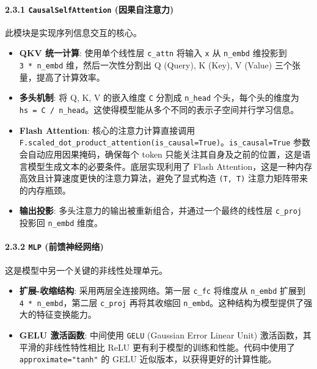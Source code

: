 \documentclass[a4paper]{article}
\providecommand{\tightlist}{%
  \setlength{\itemsep}{0pt}\setlength{\parskip}{0pt}}
\begin{document}
\paragraph{\texorpdfstring{2.3.1 \texttt{CausalSelfAttention}
(因果自注意力)}{2.3.1 CausalSelfAttention (因果自注意力)}}\label{causalselfattention-ux56e0ux679cux81eaux6ce8ux610fux529b}

此模块是实现序列信息交互的核心。

\begin{itemize}
\tightlist
\item
  \textbf{QKV 统一计算}: 使用单个线性层 \texttt{c\_attn} 将输入
  \texttt{x} 从 \texttt{n\_embd} 维投影到 \texttt{3\ *\ n\_embd}
  维，然后一次性分割出 Q (Query), K (Key), V (Value)
  三个张量，提高了计算效率。
\item
  \textbf{多头机制}: 将 Q, K, V 的嵌入维度 \texttt{C} 分割成
  \texttt{n\_head} 个头，每个头的维度为
  \texttt{hs\ =\ C\ /\ n\_head}。这使得模型能从多个不同的表示子空间并行学习信息。
\item
  \textbf{Flash Attention}: 核心的注意力计算直接调用
  \texttt{F.scaled\_dot\_product\_attention(is\_causal=True)}。\texttt{is\_causal=True}
  参数会自动应用因果掩码，确保每个 token
  只能关注其自身及之前的位置，这是语言模型生成文本的必要条件。底层实现利用了
  Flash
  Attention，这是一种内存高效且计算速度更快的注意力算法，避免了显式构造
  \texttt{(T,\ T)} 注意力矩阵带来的内存瓶颈。
\item
  \textbf{输出投影}: 多头注意力的输出被重新组合，并通过一个最终的线性层
  \texttt{c\_proj} 投影回 \texttt{n\_embd} 维度。
\end{itemize}

\paragraph{\texorpdfstring{2.3.2 \texttt{MLP}
(前馈神经网络)}{2.3.2 MLP (前馈神经网络)}}\label{mlp-ux524dux9988ux795eux7ecfux7f51ux7edc}

这是模型中另一个关键的非线性处理单元。

\begin{itemize}
\tightlist
\item
  \textbf{扩展-收缩结构}: 采用两层全连接网络。第一层 \texttt{c\_fc}
  将维度从 \texttt{n\_embd} 扩展到 \texttt{4\ *\ n\_embd}，第二层
  \texttt{c\_proj} 再将其收缩回
  \texttt{n\_embd}。这种结构为模型提供了强大的特征变换能力。
\item
  \textbf{GELU 激活函数}: 中间使用 \texttt{GELU} (Gaussian Error Linear
  Unit) 激活函数，其平滑的非线性特性相比 ReLU
  更有利于模型的训练和性能。代码中使用了 \texttt{approximate="tanh"} 的
  GELU 近似版本，以获得更好的计算性能。
\end{itemize}
\end{document}
